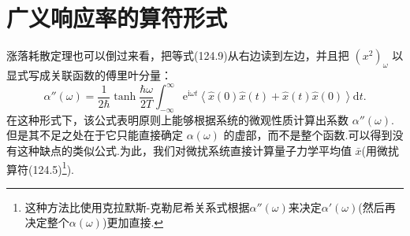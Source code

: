 \section{广义响应率的算符形式}

涨落耗散定理也可以倒过来看，把等式(124.9)从右边读到左边，并且把 $(x^2)_\omega$ 以显式写成关联函数的傅里叶分量：
\begin{equation}
  \alpha''(\omega)=\frac{1}{2\hbar}\tanh\frac{\hbar\omega}{2T}
  \int_{-\infty}^{\infty}\mathrm{e}^{\mathrm{i}\omega t}
  \left\langle\hat{x}(0)\hat{x}(t)+\hat{x}(t)\hat{x}(0)\right\rangle\mathrm{d}t.
\end{equation}
在这种形式下，该公式表明原则上能够根据系统的微观性质计算出系数 $\alpha''(\omega)$.但是其不足之处在于它只能直接确定 $\alpha(\omega)$ 的虚部，而不是整个函数.可以得到没有这种缺点的类似公式.为此，我们对微扰系统直接计算量子力学平均值 $\bar{x}$(用微扰算符(124.5)\footnote{这种方法比使用克拉默斯-克勒尼希关系式根据$\alpha''(\omega)$来决定$\alpha'(\omega)$(然后再决定整个$\alpha(\omega)$)更加直接.}).

